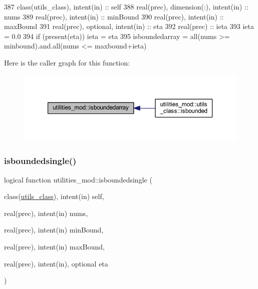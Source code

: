 \begin{DoxyCode}
387     \textcolor{keywordtype}{class}(utils\_class), \textcolor{keywordtype}{intent(in)} :: self
388     \textcolor{keywordtype}{real(prec)}, \textcolor{keywordtype}{dimension(:)}, \textcolor{keywordtype}{intent(in)} :: nums
389     \textcolor{keywordtype}{real(prec)}, \textcolor{keywordtype}{intent(in)} :: minBound
390     \textcolor{keywordtype}{real(prec)}, \textcolor{keywordtype}{intent(in)} :: maxBound
391     \textcolor{keywordtype}{real(prec)}, \textcolor{keywordtype}{optional}, \textcolor{keywordtype}{intent(in)} :: eta
392     \textcolor{keywordtype}{real(prec)} :: ieta
393     ieta = 0.0
394     \textcolor{keywordflow}{if} (\textcolor{keyword}{present}(eta)) ieta = eta
395     isboundedarray = all(nums >= minbound).and.all(nums <= maxbound+ieta)
\end{DoxyCode}
Here is the caller graph for this function\+:\nopagebreak
\begin{figure}[H]
\begin{center}
\leavevmode
\includegraphics[width=350pt]{namespaceutilities__mod_a1d16eada2f4cb344ad1500b3edba43fa_icgraph}
\end{center}
\end{figure}
\mbox{\label{namespaceutilities__mod_a258d85bcc477041275bd954667168ea3}} 
\subsubsection{\texorpdfstring{isboundedsingle()}{isboundedsingle()}}
{\footnotesize\ttfamily logical function utilities\+\_\+mod\+::isboundedsingle (\begin{DoxyParamCaption}\item[{class(\mbox{\hyperlink{structutilities__mod_1_1utils__class}{utils\+\_\+class}}), intent(in)}]{self,  }\item[{real(prec), intent(in)}]{nums,  }\item[{real(prec), intent(in)}]{min\+Bound,  }\item[{real(prec), intent(in)}]{max\+Bound,  }\item[{real(prec), intent(in), optional}]{eta }\end{DoxyParamCaption})\hspace{0.3cm}{\ttfamily [private]}}



